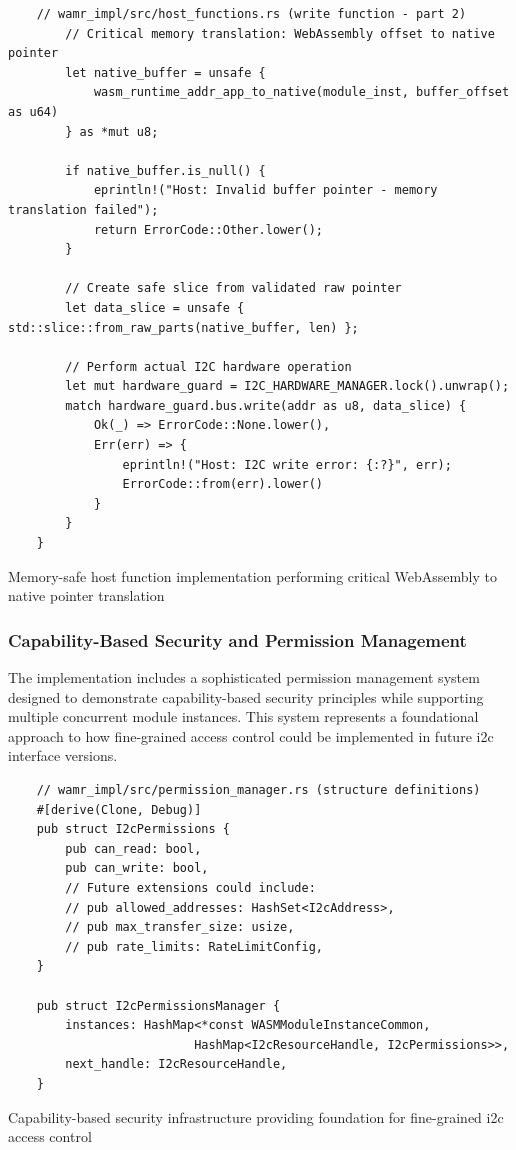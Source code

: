 \begin{listing}[H]
    \begin{verbatim}
    // wamr_impl/src/host_functions.rs (write function - part 2)
        // Critical memory translation: WebAssembly offset to native pointer
        let native_buffer = unsafe {
            wasm_runtime_addr_app_to_native(module_inst, buffer_offset as u64)
        } as *mut u8;
        
        if native_buffer.is_null() {
            eprintln!("Host: Invalid buffer pointer - memory translation failed");
            return ErrorCode::Other.lower();
        }
    
        // Create safe slice from validated raw pointer
        let data_slice = unsafe { std::slice::from_raw_parts(native_buffer, len) };
        
        // Perform actual I2C hardware operation
        let mut hardware_guard = I2C_HARDWARE_MANAGER.lock().unwrap();
        match hardware_guard.bus.write(addr as u8, data_slice) {
            Ok(_) => ErrorCode::None.lower(),
            Err(err) => {
                eprintln!("Host: I2C write error: {:?}", err);
                ErrorCode::from(err).lower()
            }
        }
    }
    \end{verbatim}
    \caption{Memory-safe host function implementation performing critical WebAssembly to native pointer translation}
    \label{lst:wamr-host-function-pt2}
\end{listing}

\subsubsection{Capability-Based Security and Permission Management}

The implementation includes a sophisticated permission management system designed to demonstrate capability-based security principles while supporting multiple concurrent module instances. This system represents a foundational approach to how fine-grained access control could be implemented in future \acrshort{i2c} interface versions.

\begin{listing}[H]
    \begin{verbatim}
    // wamr_impl/src/permission_manager.rs (structure definitions)
    #[derive(Clone, Debug)]
    pub struct I2cPermissions {
        pub can_read: bool,
        pub can_write: bool,
        // Future extensions could include:
        // pub allowed_addresses: HashSet<I2cAddress>,
        // pub max_transfer_size: usize,
        // pub rate_limits: RateLimitConfig,
    }
    
    pub struct I2cPermissionsManager {
        instances: HashMap<*const WASMModuleInstanceCommon, 
                          HashMap<I2cResourceHandle, I2cPermissions>>,
        next_handle: I2cResourceHandle,
    }
    \end{verbatim}
    \caption{Capability-based security infrastructure providing foundation for fine-grained \acrshort{i2c} access control}
    \label{lst:permission-structures}
\end{listing}

